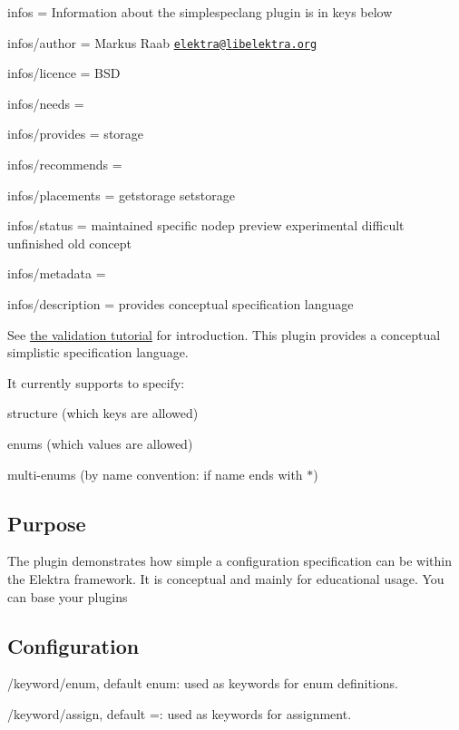 
\begin{DoxyItemize}
\item infos = Information about the simplespeclang plugin is in keys below
\item infos/author = Markus Raab \href{mailto:elektra@libelektra.org}{\tt elektra@libelektra.\+org}
\item infos/licence = B\+SD
\item infos/needs =
\item infos/provides = storage
\item infos/recommends =
\item infos/placements = getstorage setstorage
\item infos/status = maintained specific nodep preview experimental difficult unfinished old concept
\item infos/metadata =
\item infos/description = provides conceptual specification language
\end{DoxyItemize}

See \hyperlink{md_doc_tutorials_validation_doc_tutorials_validation_md}{the validation tutorial} for introduction. This plugin provides a conceptual simplistic specification language.

It currently supports to specify\+:


\begin{DoxyItemize}
\item structure (which keys are allowed)
\item enums (which values are allowed)
\item multi-\/enums (by name convention\+: if name ends with {\ttfamily $\ast$})
\end{DoxyItemize}

\subsection*{Purpose}

The plugin demonstrates how simple a configuration specification can be within the Elektra framework. It is conceptual and mainly for educational usage. You can base your plugins

\subsection*{Configuration}


\begin{DoxyItemize}
\item {\ttfamily /keyword/enum}, default {\ttfamily enum}\+: used as keywords for enum definitions.
\item {\ttfamily /keyword/assign}, default {\ttfamily =}\+: used as keywords for assignment.
\end{DoxyItemize}

